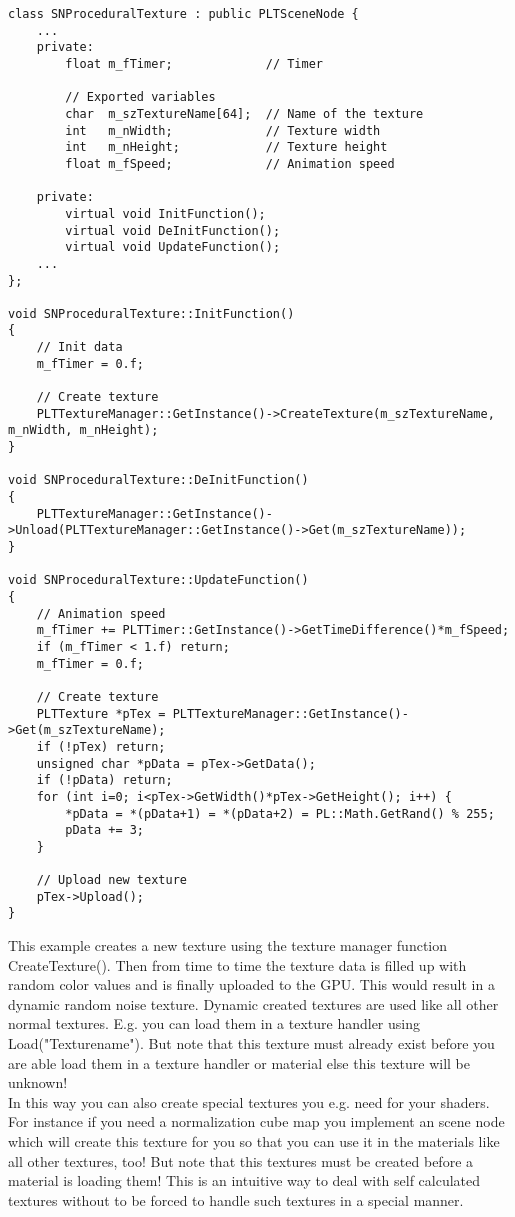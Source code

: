 \begin{lstlisting}[caption=Procedural texture class]
class SNProceduralTexture : public PLTSceneNode {
	...
	private:
		float m_fTimer;             // Timer

		// Exported variables
		char  m_szTextureName[64];  // Name of the texture
		int   m_nWidth;             // Texture width
		int   m_nHeight;            // Texture height
		float m_fSpeed;             // Animation speed

	private:
		virtual void InitFunction();
		virtual void DeInitFunction();
		virtual void UpdateFunction();
	...
};

void SNProceduralTexture::InitFunction()
{
	// Init data
	m_fTimer = 0.f;

	// Create texture
	PLTTextureManager::GetInstance()->CreateTexture(m_szTextureName, m_nWidth, m_nHeight);
}

void SNProceduralTexture::DeInitFunction()
{
	PLTTextureManager::GetInstance()->Unload(PLTTextureManager::GetInstance()->Get(m_szTextureName));
}

void SNProceduralTexture::UpdateFunction()
{
	// Animation speed
	m_fTimer += PLTTimer::GetInstance()->GetTimeDifference()*m_fSpeed;
	if (m_fTimer < 1.f) return;
	m_fTimer = 0.f;

	// Create texture
	PLTTexture *pTex = PLTTextureManager::GetInstance()->Get(m_szTextureName);
	if (!pTex) return;
	unsigned char *pData = pTex->GetData();
	if (!pData) return;
	for (int i=0; i<pTex->GetWidth()*pTex->GetHeight(); i++) {
		*pData = *(pData+1) = *(pData+2) = PL::Math.GetRand() % 255;
		pData += 3;
	}

	// Upload new texture
	pTex->Upload();
}
\end{lstlisting}

This example creates a new texture using the texture manager function CreateTexture(). Then from
time to time the texture data is filled up with random color values and is finally uploaded to the \ac{GPU}.
This would result in a dynamic random noise texture. Dynamic created textures are used like all other normal
textures. E.g. you can load them in a texture handler using Load("Texturename"). But note that
this texture must already exist before you are able load them in a texture handler or material else
this texture will be unknown!\\
In this way you can also create special textures you e.g. need for your shaders. For instance
if you need a normalization cube map you implement an scene node which will create this texture for you
so that you can use it in the materials like all other textures, too! But note that this textures
must be created before a material is loading them! This is an intuitive way to deal with self calculated
textures without to be forced to handle such textures in a special manner.



